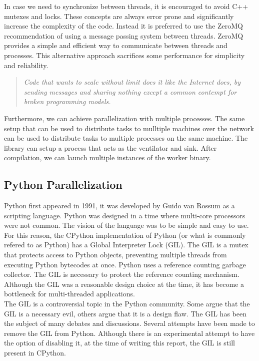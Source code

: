 \begin{spacing}{1.2}
    In case we need to synchronize between threads, it is encouraged to avoid C++ mutexes and locks.
    These concepts are always error prone and significantly increase the complexity of the code.
    Instead it is preferred to use the ZeroMQ recommendation of using a message passing system 
    between threads. ZeroMQ provides a simple and efficient way to communicate between threads
    and processes. This alternative approach sacrifices some performance for simplicity and reliability.

    \begin{quote}
        \textit{Code that wants to scale without limit does it like the Internet does, by sending messages
        and sharing nothing except a common contempt for broken programming models.} \cite{hintjens2013zeromq}
    \end{quote}

    Furthermore, we can achieve parallelization with multiple processes. The same 
    setup that can be used to distribute tasks to mulltiple machines over the network 
    can be used to distribute tasks to multiple processes on the same machine.
    The library can setup a process that acts as the ventilator and sink. After compilation,
    we can launch multiple instances of the worker binary. 

    \subsection{Python Parallelization}

    Python first appeared in 1991, it was developed by Guido van Rossum as a scripting language.
    Python was designed in a time where multi-core processors were not common. The vision 
    of the language was to be simple and easy to use. For this reason, the CPython implementation 
    of Python (or what is commonly refered to as Python) has a Global Interpreter Lock (GIL).
    The GIL is a mutex that protects access to Python objects, preventing multiple threads from executing
    Python bytecodes at once. Python uses a reference counting garbage collector. The GIL is necessary
    to protect the reference counting mechanism. Although the GIL was a reasonable design choice
    at the time, it has become a bottleneck for multi-threaded applications.\\

    The GIL is a controversial topic in the Python community. Some argue that the GIL is a necessary
    evil, others argue that it is a design flaw. The GIL has been the subject of many debates and discussions.
    Several attempts have been made to remove the GIL from Python. Although there is an 
    experimental attempt to have the option of disabling it, at the time of writing 
    this report, the GIL is still present in CPython.\\


\end{spacing}
